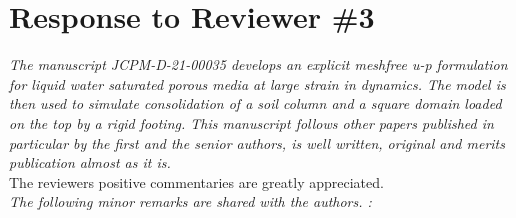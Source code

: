 \documentclass[12pt]{article}
\begin{document}
\section*{Response to Reviewer \#3}

\textit{The manuscript JCPM-D-21-00035 develops an explicit meshfree u-p formulation for liquid water saturated porous media at large strain in dynamics. The model is then used to simulate consolidation of a soil column and a square domain loaded on the top by a rigid footing. This manuscript follows other papers published in particular by the first and the senior authors, is well written, original and merits publication almost as it is.}\\

The reviewer\textquotesingle s positive commentaries are greatly appreciated.\\

\textit{The following minor remarks are shared with the authors. :}\\
\end{document}
